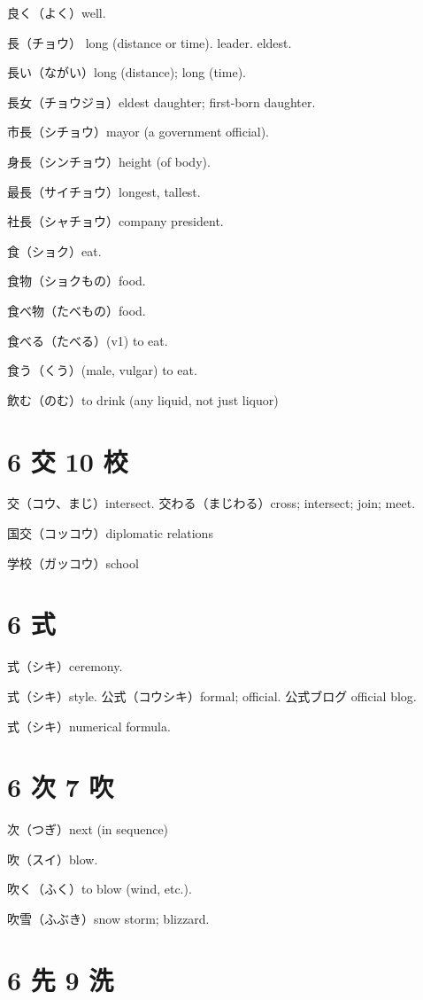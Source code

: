 良く（よく）well.

長（チョウ）
long (distance or time).
leader.
eldest.

長い（ながい）long (distance); long (time).

長女（チョウジョ）eldest daughter; first-born daughter.

市長（シチョウ）mayor (a government official).

身長（シンチョウ）height (of body).

最長（サイチョウ）longest, tallest.

社長（シャチョウ）company president.

食（ショク）eat.

食物（ショクもの）food.

食べ物（たべもの）food.

食べる（たべる）(v1) to eat.

食う（くう）(male, vulgar) to eat.

飲む（のむ）to drink (any liquid, not just liquor)

\section{6 交 10 校}

交（コウ、まじ）intersect.
交わる（まじわる）cross; intersect; join; meet.

国交（コッコウ）diplomatic relations

学校（ガッコウ）school

\section{6 式}

式（シキ）ceremony.

式（シキ）style.
公式（コウシキ）formal; official.
公式ブログ official blog.

式（シキ）numerical formula.

\section{6 次 7 吹}

次（つぎ）next (in sequence)

吹（スイ）blow.

吹く（ふく）to blow (wind, etc.).

吹雪（ふぶき）snow storm; blizzard.

\section{6 先 9 洗}


